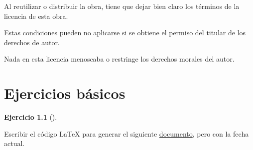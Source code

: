 \documentclass[
  a4paper,
]{scrreport}
\theoremstyle{definition}
\newtheorem{exercise}{Ejercicio}[chapter]
\theoremstyle{remark}
\begin{document}
Al reutilizar o distribuir la obra, tiene que dejar bien claro los
términos de la licencia de esta obra.

Estas condiciones pueden no aplicarse si se obtiene el permiso del
titular de los derechos de autor.

Nada en esta licencia menoscaba o restringe los derechos morales del
autor.


\hypertarget{ejercicios-buxe1sicos}{%
\chapter{Ejercicios básicos}\label{ejercicios-buxe1sicos}}

\begin{exercise}[]\protect\hypertarget{exr-hola-mundo}{}\label{exr-hola-mundo}

Escribir el código LaTeX para generar el siguiente
\href{doc/ejercicio1.pdf}{documento}, pero con la fecha actual.

\begin{tcolorbox}[enhanced jigsaw, left=2mm, colbacktitle=quarto-callout-note-color!10!white, toprule=.15mm, coltitle=black, leftrule=.75mm, arc=.35mm, colback=white, opacitybacktitle=0.6, rightrule=.15mm, colframe=quarto-callout-note-color-frame, title=\textcolor{quarto-callout-note-color}{\faInfo}\hspace{0.5em}{Ver documento}, bottomrule=.15mm, breakable, opacityback=0, bottomtitle=1mm, toptitle=1mm, titlerule=0mm]

\end{tcolorbox}

\end{exercise}
\end{document}
